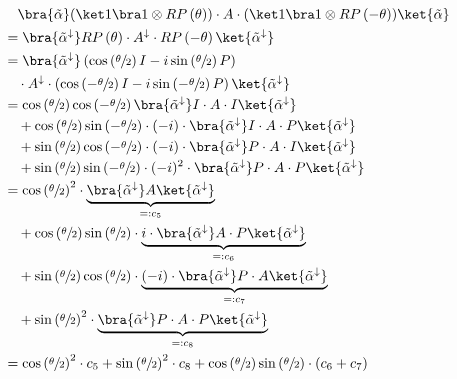 \begin{equation}
    \label{eq:single-prob-simplification3}
    \begin{split}
            &\quad \bra{\tilde\alpha} (\ket 1 \bra 1 \otimes RP\left(\theta\right)) \cdot A \cdot (\ket 1 \bra 1 \otimes RP\left(-\theta\right)) \ket{\tilde\alpha} \\
            &= \bra{\tilde\alpha^\downarrow} RP\left(\theta\right) \cdot A^\downarrow \cdot RP\left(-\theta\right) \ket{\tilde\alpha^\downarrow} \\
            &= \bra{\tilde\alpha^\downarrow} \left(\cos\left(\sfrac\theta2\right) I - i \sin\left(\sfrac\theta2\right) P\right) \\
                &\quad\cdot A^\downarrow \cdot \left(\cos\left(-\sfrac\theta2\right) I - i \sin\left(-\sfrac\theta2\right) P\right) \ket{\tilde\alpha^\downarrow} \\
            &= \cos\left(\sfrac\theta2\right)\cos\left(-\sfrac\theta2\right) \bra{\tilde\alpha^\downarrow} I \cdot A \cdot I \ket{\tilde\alpha^\downarrow} \\
                &\quad + \cos\left(\sfrac\theta2\right)\sin\left(-\sfrac\theta2\right) \cdot (-i) \cdot \bra{\tilde\alpha^\downarrow} I \cdot A \cdot P \ket{\tilde\alpha^\downarrow}  \\
                &\quad + \sin\left(\sfrac\theta2\right)\cos\left(-\sfrac\theta2\right) \cdot (-i) \cdot \bra{\tilde\alpha^\downarrow} P \cdot A \cdot I \ket{\tilde\alpha^\downarrow} \\
                &\quad + \sin\left(\sfrac\theta2\right)\sin\left(-\sfrac\theta2\right) \cdot (-i)^2 \cdot \bra{\tilde\alpha^\downarrow} P \cdot A \cdot P \ket{\tilde\alpha^\downarrow} \\
            &= \cos\left(\sfrac\theta2\right)^2 \cdot \underbrace{\bra{\tilde\alpha^\downarrow} A \ket{\tilde\alpha^\downarrow}}_{=: c_5} \\
                &\quad + \cos\left(\sfrac\theta2\right)\sin\left(\sfrac\theta2\right) \cdot \underbrace{i \cdot \bra{\tilde\alpha^\downarrow} A \cdot P \ket{\tilde\alpha^\downarrow}}_{=: c_6} \\
                &\quad + \sin\left(\sfrac\theta2\right)\cos\left(\sfrac\theta2\right) \cdot \underbrace{(-i) \cdot \bra{\tilde\alpha^\downarrow} P \cdot A \ket{\tilde\alpha^\downarrow}}_{=: c_7} \\
                &\quad + \sin\left(\sfrac\theta2\right)^2 \cdot \underbrace{\bra{\tilde\alpha^\downarrow} P \cdot A \cdot P \ket{\tilde\alpha^\downarrow}}_{=: c_8} \\
            &= \cos\left(\sfrac\theta2\right)^2 \cdot c_5 + \sin\left(\sfrac\theta2\right)^2 \cdot c_8 + \cos\left(\sfrac\theta2\right)\sin\left(\sfrac\theta2\right) \cdot \left(c_6 + c_7\right)
    \end{split}
\end{equation}


